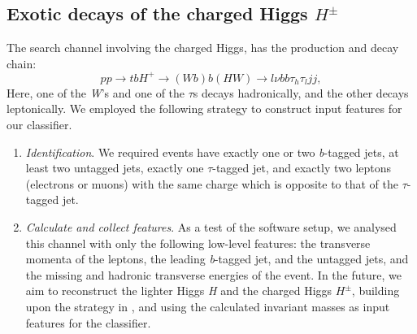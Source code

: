{\subsection{Exotic decays of the charged Higgs $H^\pm$}\label{subsec:Hpm_analysis}
The search channel involving the charged Higgs, has the production and decay chain: 
\[pp\rightarrow tbH^+\rightarrow (Wb)b(HW)\rightarrow l\nu bb\tau_h\tau_ljj,\]
Here, one of the \emph{W}'s and one of the $\tau$s decays hadronically, and the other decays leptonically.
We employed the following strategy to construct input features for our classifier. 
\begin{enumerate}
  \item \emph{Identification}. We required events have exactly one or two \emph{b}-tagged jets, at least two untagged jets, exactly one $\tau$-tagged jet, and exactly two leptons (electrons or muons) with the same charge which is opposite to that of the $\tau$-tagged jet.
  \item\emph{Calculate and collect features}. As a test of the software setup, we analysed this channel with only the following low-level features: the transverse momenta of the leptons, the leading \emph{b}-tagged jet, and the untagged jets, and the missing and hadronic transverse energies of the event. In the future, we aim to reconstruct the lighter Higgs \emph{H} and the charged Higgs $H^\pm$, building upon the strategy in \cite{Coleppa2014a}, and using the calculated invariant masses as input features for the classifier.
\end{enumerate}

}
